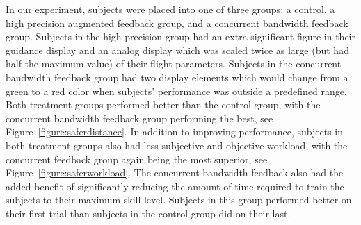 \documentclass[float=false, crop=false]{standalone}
\begin{document}
In our experiment, subjects were placed into one of three groups: a control, a high precision augmented feedback group, and a concurrent bandwidth feedback group.
Subjects in the high precision group had an extra significant figure in their guidance display and an analog display which was scaled twice as large (but had half the maximum value) of their flight parameters.
Subjects in the concurrent bandwidth feedback group had two display elements which would change from a green to a red color when subjects' performance was outside a predefined range.
Both treatment groups performed better than the control group, with the concurrent bandwidth feedback group performing the best, see Figure~\ref{figure:saferdistance}.
In addition to improving performance, subjects in both treatment groups also had less subjective and objective workload, with the concurrent feedback group again being the most superior, see Figure~\ref{figure:saferworkload}.
The concurrent bandwidth feedback also had the added benefit of significantly reducing the amount of time required to train the subjects to their maximum skill level.
Subjects in this group performed better on their first trial than subjects in the control group did on their last.
\end{document}
